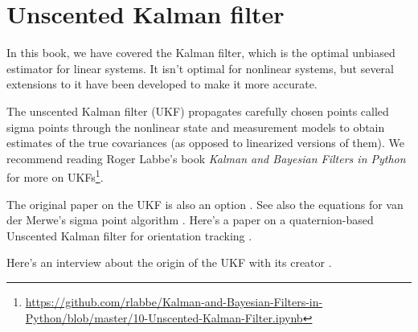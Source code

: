 \section{Unscented Kalman filter}
\label{sec:ukf}

In this book, we have covered the Kalman filter, which is the optimal unbiased
estimator for linear \glspl{system}. It isn't optimal for nonlinear
\glspl{system}, but several extensions to it have been developed to make it more
accurate.

The unscented Kalman filter (UKF) propagates carefully chosen points called
sigma points through the nonlinear state and measurement models to obtain
estimates of the true covariances (as opposed to linearized versions of them).
We recommend reading Roger Labbe's book \textit{Kalman and Bayesian Filters in
Python} for more on
UKFs\footnote{\url{https://github.com/rlabbe/Kalman-and-Bayesian-Filters-in-Python/blob/master/10-Unscented-Kalman-Filter.ipynb}}.

The original paper on the UKF is also an option
\cite{bib:unscented_kalman_filter}. See also the equations for van der Merwe's
sigma point algorithm \cite{bib:unscented_kalman_filter_2}. Here's a paper on a
quaternion-based Unscented Kalman filter for orientation tracking
\cite{bib:ukf_state_tracking}.

Here's an interview about the origin of the UKF with its creator
\cite{bib:first-hand_the_ut}.
